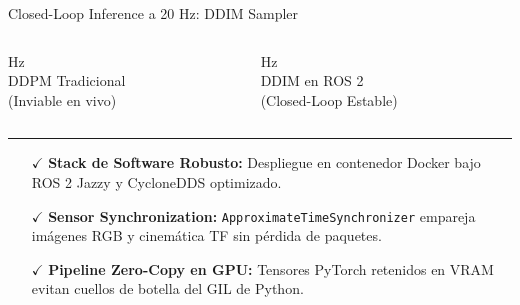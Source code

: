 \begin{frame}{Closed-Loop Inference a 20 Hz: DDIM Sampler}
\begin{columns}[T, onlytextwidth]
    \begin{column}{0.485\textwidth}
      \begin{tcolorbox}[
        enhanced,
        colback=AgriGreenLight,
        colframe=AgriGreen,
        arc=\CardArc,
        boxrule=\CardRule,
        height=\CardHeightDouble,
        title={\CardTitleFont Control Rate Real en ROS 2},
        colbacktitle=AgriGreen,
        coltitle=WhiteBg,
        top=1.2mm, bottom=1.2mm, left=1.8mm, right=1.8mm
      ]
        \centering
        \begin{columns}[T, onlytextwidth]
          \begin{column}{0.48\textwidth}
            \centering
            \textcolor{AlertRed}{ Hz}\\[0.2mm]
            {\KpiLabelFont DDPM Tradicional\\(Inviable en vivo)}
          \end{column}
          \begin{column}{0.48\textwidth}
            \centering
            \textcolor{AgriGreen}{ Hz}\\[0.2mm]
            {\KpiLabelFont DDIM en ROS 2\\(Closed-Loop Estable)}
          \end{column}
        \end{columns}
        \vspace{1mm}\hrule\vspace{1mm}
        {\BodyFont
        \begin{itemize}\setlength{\itemsep}{1.2pt}
          \item[\textcolor{AgriGreen}{\textbf{$\checkmark$}}] \textbf{Stack de Software Robusto:} Despliegue en contenedor Docker bajo ROS 2 Jazzy y CycloneDDS optimizado.
          \item[\textcolor{AgriGreen}{\textbf{$\checkmark$}}] \textbf{Sensor Synchronization:} \texttt{ApproximateTimeSynchronizer} empareja imágenes RGB y cinemática TF sin pérdida de paquetes.
          \item[\textcolor{AgriGreen}{\textbf{$\checkmark$}}] \textbf{Pipeline Zero-Copy en GPU:} Tensores PyTorch retenidos en VRAM evitan cuellos de botella del GIL de Python.
        \end{itemize}}
      \end{tcolorbox}
    \end{column}
  \end{columns}
\end{frame}

